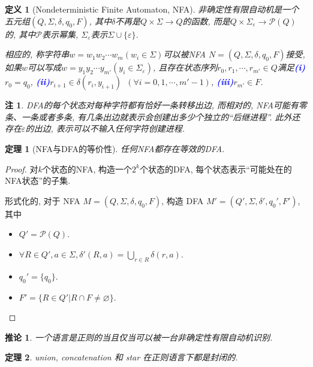 \documentclass[8pt]{article}
\theoremstyle{compact}
\newtheorem{theorem}{定理}[section]
\newtheorem{definition}{定义}[section]
\newtheorem{corollary}{推论}[section]
\newtheorem{remark}{注}[section]
\def\num#1{\textnormal{\textbf{\mbox{\textcolor{blue}{(#1)}}}}}
\begin{document}
\begin{definition}[Nondeterministic Finite Automaton, NFA]
	非确定性有限自动机是一个五元组$(Q, \Sigma, \delta, q_0, F)$, 其中$\delta$不再是$Q \times \Sigma \to Q$的函数, 而是$Q \times \Sigma_{\varepsilon} \to \mathcal P(Q)$的, 其中$\mathcal P$表示幂集, $\Sigma_{\varepsilon}$表示$\Sigma \cup \{\varepsilon\}$. 

	相应的, 称字符串$w = w_1w_2\cdots w_m(w_i \in \Sigma)$可以被NFA $N = (Q, \Sigma, \delta, q_0, F)$接受, 如果$w$可以写成$w = y_1y_2\cdots y_{m'}(y_i \in \Sigma_{\varepsilon})$, 且存在状态序列$r_0, r_1, \cdots, r_{m'} \in Q$满足\num{i}$r_0 = q_0$, \num{ii}$r_{i+1} \in \delta(r_i, y_{i+1})$\ $(\forall i = 0, 1, \cdots, {m'}-1)$, \num{iii}$r_{m'} \in F$. 
\end{definition}
\begin{remark}
	DFA的每个状态对每种字符都有恰好一条转移出边, 而相对的, NFA可能有零条、一条或者多条, 有几条出边就表示会创建出多少个独立的“后继进程”. 此外还存在$\varepsilon$的出边, 表示可以不输入任何字符创建进程. 
\end{remark}
\begin{theorem}[NFA与DFA的等价性]
	任何NFA都存在等效的DFA. 
\end{theorem}
\begin{proof}
	对$k$个状态的NFA, 构造一个$2^k$个状态的DFA, 每个状态表示“可能处在的NFA状态”的子集. 

	形式化的, 对于 NFA $M = (Q, \Sigma, \delta, q_0, F)$, 构造 DFA $M' = (Q', \Sigma, \delta', q_0', F')$, 其中
	\begin{itemize}
		\item $Q' = \mathcal P(Q)$.
		\item $\forall R \in Q', a \in \Sigma, \delta'(R, a) = \bigcup_{r \in R}\delta(r, a)$.
		\item $q_0' = \{q_0\}$.
		\item $F' = \{R \in Q' | R \cap F \neq \varnothing\}$.
	\end{itemize}
\end{proof}
\begin{corollary}
	一个语言是正则的当且仅当可以被一台非确定性有限自动机识别. 
\end{corollary}
\begin{theorem}
	union, concatenation 和 star 在正则语言下都是封闭的. 
\end{theorem}
\end{document}
